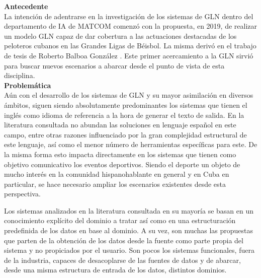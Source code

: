     \textbf{Antecedente}\\

    La intención de adentrarse en la investigación de los sistemas de GLN dentro del departamento de IA de MATCOM comenzó con la propuesta, en 2019, 
de realizar un modelo GLN capaz de dar cobertura a las actuaciones destacadas de los peloteros cubanos en las Grandes Ligas de Béisbol. La misma derivó 
en el trabajo de tesis de Roberto Balboa González . Este primer acercamiento a la GLN sirvió para buscar nuevos escenarios a abarcar 
desde el punto de vista de esta disciplina.\\


       \textbf{Problemática}\\

    Aún con el desarrollo de los sistemas de GLN y su mayor asimilación en diversos ámbitos, siguen siendo absolutamente predominantes los 
sistemas que tienen el inglés como idioma de referencia a la hora de generar el texto de salida. En la literatura consultada no abundan las soluciones 
en lenguaje español en este campo, entre otras razones influenciado por la gran complejidad estructural de este lenguaje, así como el menor número 
de herramientas específicas para este. De la misma forma esto impacta directamente en los sistemas que tienen como objetivo comunicativo los eventos deportivos. Siendo el deporte un objeto de mucho interés en la 
comunidad hispanohablante en general y en Cuba en particular, se hace necesario ampliar los escenarios existentes desde esta perspectiva.

    Los sistemas analizados en la literatura consultada en su mayoría se basan en un conocimiento explícito del dominio a tratar así como en una 
estructuración predefinida de los datos en base al dominio. A su vez, son muchas las propuestas que parten de la obtención de los datos desde 
la fuente como parte propia del sistema y no propiciados por el usuario. Son pocos los sistemas funcionales, fuera de la industria, capaces de 
desacoplarse de las fuentes de datos y de abarcar, desde una misma estructura de entrada de los datos, distintos dominios.\\


   


